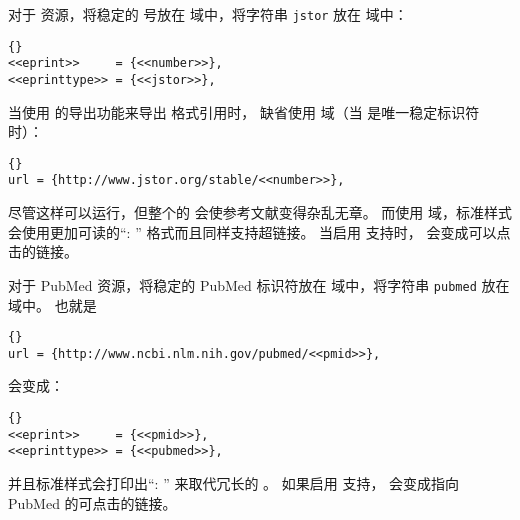 对于  资源，将稳定的  号放在  域中，将字符串 \texttt{jstor} 放在  域中：

\begin{lstlisting}[style=bibtex]{}
<<eprint>>     = {<<number>>},
<<eprinttype>> = {<<jstor>>},
\end{lstlisting}
%
当使用  的导出功能来导出 \BibTeX 格式引用时，
 缺省使用  域（当  是唯一稳定标识符时）：

\begin{lstlisting}[style=bibtex]{}
url = {http://www.jstor.org/stable/<<number>>},
\end{lstlisting}
%
尽管这样可以运行，但整个的  会使参考文献变得杂乱无章。
而使用  域，标准样式会使用更加可读的“: ” 格式而且同样支持超链接。
当启用  支持时， 会变成可以点击的链接。

对于 PubMed 资源，将稳定的 PubMed 标识符放在  域中，将字符串 \texttt{pubmed} 放在  域中。
也就是

\begin{lstlisting}[style=bibtex]{}
url = {http://www.ncbi.nlm.nih.gov/pubmed/<<pmid>>},
\end{lstlisting}
%
会变成：

\begin{lstlisting}[style=bibtex]{}
<<eprint>>     = {<<pmid>>},
<<eprinttype>> = {<<pubmed>>},
\end{lstlisting}
%
并且标准样式会打印出“: ” 来取代冗长的 。
如果启用  支持， 会变成指向 PubMed 的可点击的链接。


